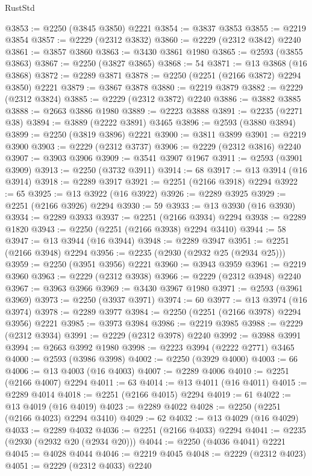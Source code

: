 \begin{lexlean}{RustStd}
\begin{coremodule}
{\begin{coremodule}
{{{{{{{{{{{{{{{{{{{{{{{{{{{{{{{{{{{{{{{{{{{{{{{{{{{{{@3853 := @2250 (@3845 @3850) @2221
@3854 := @3837 @3853
@3855 := @2219 @3854
@3857 := @2229 (@2312 @3832)
@3860 := @2229 (@2312 @3842) @2240
@3861 := @3857 @3860
@3863 := @3430 @3861 @1980
@3865 := @2593 (@3855 @3863)
@3867 := @2250 (@3827 @3865)
@3868 := 54
@3871 := @13 @3868 (@16 @3868)
@3872 := @2289 @3871
@3878 := @2250 (@2251 (@2166 @3872) @2294 @3850) @2221
@3879 := @3867 @3878
@3880 := @2219 @3879
@3882 := @2229 (@2312 @3824)
@3885 := @2229 (@2312 @3872) @2240
@3886 := @3882 @3885
@3888 := @2663 @3886 @1980
@3889 := @2223 @3888
@3891 := @2235 (@2271 @38)
@3894 := @3889 (@2222 @3891) @3465
@3896 := @2593 (@3880 @3894)
@3899 := @2250 (@3819 @3896) @2221
@3900 := @3811 @3899
@3901 := @2219 @3900
@3903 := @2229 (@2312 @3737)
@3906 := @2229 (@2312 @3816) @2240
@3907 := @3903 @3906
@3909 := @3541 @3907 @1967
@3911 := @2593 (@3901 @3909)
@3913 := @2250 (@3732 @3911)
@3914 := 68
@3917 := @13 @3914 (@16 @3914)
@3918 := @2289 @3917
@3921 := @2251 (@2166 @3918) @2294
@3922 := 65
@3925 := @13 @3922 (@16 @3922)
@3926 := @2289 @3925
@3929 := @2251 (@2166 @3926) @2294
@3930 := 59
@3933 := @13 @3930 (@16 @3930)
@3934 := @2289 @3933
@3937 := @2251 (@2166 @3934) @2294
@3938 := @2289 @1820
@3943 := @2250 (@2251 (@2166 @3938) @2294 @3410)
@3944 := 58
@3947 := @13 @3944 (@16 @3944)
@3948 := @2289 @3947
@3951 := @2251 (@2166 @3948) @2294
@3956 := @2235 (@2930 (@2932 @25 (@2934 @25)))
@3959 := @2250 (@3951 @3956) @2221
@3960 := @3943 @3959
@3961 := @2219 @3960
@3963 := @2229 (@2312 @3938)
@3966 := @2229 (@2312 @3948) @2240
@3967 := @3963 @3966
@3969 := @3430 @3967 @1980
@3971 := @2593 (@3961 @3969)
@3973 := @2250 (@3937 @3971)
@3974 := 60
@3977 := @13 @3974 (@16 @3974)
@3978 := @2289 @3977
@3984 := @2250 (@2251 (@2166 @3978) @2294 @3956) @2221
@3985 := @3973 @3984
@3986 := @2219 @3985
@3988 := @2229 (@2312 @3934)
@3991 := @2229 (@2312 @3978) @2240
@3992 := @3988 @3991
@3994 := @2663 @3992 @1980
@3998 := @2223 @3994 (@2222 @2771) @3465
@4000 := @2593 (@3986 @3998)
@4002 := @2250 (@3929 @4000)
@4003 := 66
@4006 := @13 @4003 (@16 @4003)
@4007 := @2289 @4006
@4010 := @2251 (@2166 @4007) @2294
@4011 := 63
@4014 := @13 @4011 (@16 @4011)
@4015 := @2289 @4014
@4018 := @2251 (@2166 @4015) @2294
@4019 := 61
@4022 := @13 @4019 (@16 @4019)
@4023 := @2289 @4022
@4028 := @2250 (@2251 (@2166 @4023) @2294 @3410)
@4029 := 62
@4032 := @13 @4029 (@16 @4029)
@4033 := @2289 @4032
@4036 := @2251 (@2166 @4033) @2294
@4041 := @2235 (@2930 (@2932 @20 (@2934 @20)))
@4044 := @2250 (@4036 @4041) @2221
@4045 := @4028 @4044
@4046 := @2219 @4045
@4048 := @2229 (@2312 @4023)
@4051 := @2229 (@2312 @4033) @2240
}}}}}}}}}}}}}}}}}}}}}}}}}}}}}}}}}}}}}}}}}}}}}}}}}}}}}
\end{coremodule}}
\end{coremodule}
\end{lexlean}
